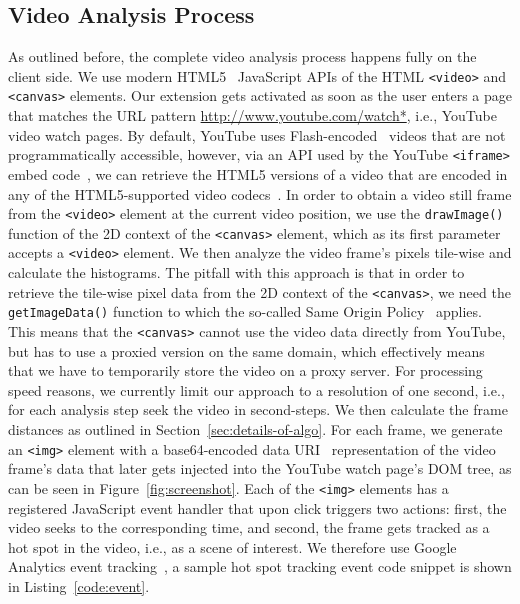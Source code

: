 \documentclass[10pt,twocolumn,letterpaper]{article}
\begin{document}
\subsection{Video Analysis Process}
As outlined before, the complete video analysis process happens fully on the client side. We use modern HTML5~\cite{w3c_html5} JavaScript APIs of the HTML \texttt{<video>} and \texttt{<canvas>} elements. Our extension gets activated as soon as the user enters a page that matches the URL pattern \url{http://www.youtube.com/watch*}, i.e., YouTube video watch pages. By default, YouTube uses Flash-encoded~\cite{flash} videos that are not programmatically accessible, however, via an API used by the YouTube \texttt{<iframe>} embed code~\cite{youtubeiframe}, we can retrieve the HTML5 versions of a video that are encoded in any of the HTML5-supported video codecs~\cite{html5video}. In order to obtain a video still frame from the \texttt{<video>} element at the current video position, we use the \texttt{drawImage()} function of the 2D context of the \texttt{<canvas>} element, which as its first parameter accepts a \texttt{<video>} element. We then analyze the video frame's pixels tile-wise and calculate the histograms. The pitfall with this approach is that in order to retrieve the tile-wise pixel data from the 2D context of the \texttt{<canvas>}, we need the \texttt{getImageData()} function to which the so-called Same Origin Policy~\cite{sameoriginpolicy} applies. This means that the \texttt{<canvas>} cannot use the video data directly  from YouTube, but has to use a proxied version on the same domain, which effectively means that we have to temporarily store the video on a proxy server. For processing speed reasons, we currently limit our approach to a resolution of one second, i.e., for each analysis step seek the video in second-steps. We then calculate the frame distances as outlined in Section~\ref{sec:details-of-algo}. For each frame, we generate an \texttt{<img>} element with a base64-encoded data URI~\cite{datauri} representation of the video frame's data that later gets injected into the YouTube watch page's DOM tree, as can be seen in Figure~\ref{fig:screenshot}. Each of the \texttt{<img>} elements has a registered JavaScript event handler that upon click triggers two actions: first, the video seeks to the corresponding time, and second, the frame gets tracked as a hot spot in the video, i.e., as a scene of interest. We therefore use Google Analytics event tracking~\cite{analyticsevent}, a sample hot spot tracking event code snippet is shown in Listing~\ref{code:event}.
\end{document}
